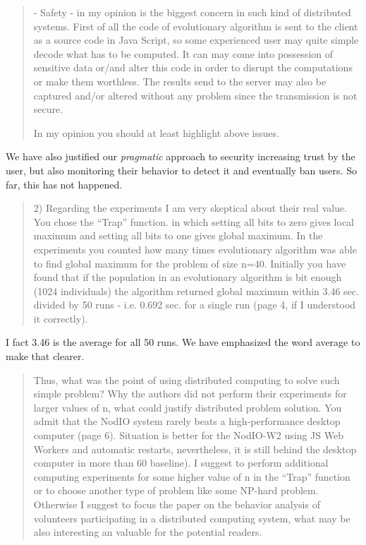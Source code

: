 \documentclass[preprint]{elsarticle}
\begin{document}
\begin{quote} 

 - Safety - in my opinion is the biggest concern in such kind of distributed systems. First of all the
 code of evolutionary algorithm is sent to the client as a source code in Java Script, so some
 experienced user may quite simple decode what has to be computed. It can may come into
 possession of sensitive data or/and alter this code in order to disrupt the computations or make
 them worthless. The results send to the server may also be captured and/or altered without any
 problem since the transmission is not secure.

 In my opinion you should at least highlight above issues.
\end{quote}

We have also justified our {\em pragmatic} approach to security
increasing trust by the user, but also monitoring their behavior to
detect it and eventually ban users. So far, this has not happened. 

\begin{quote}
2) Regarding the experiments I am very skeptical about their real value. You chose the ``Trap''
function. in which setting all bits to zero gives local maximum and setting all bits to one gives global
maximum. In the experiments you counted how many times evolutionary algorithm was able to find
global maximum for the problem of size n=40. Initially you have found that if the population in an
evolutionary algorithm is bit enough (1024 individuals) the algorithm returned global maximum
within 3.46 sec. divided by 50 runs - i.e. 0.692 sec. for a single run
(page 4, if I understood it correctly).
\end{quote}

I fact 3.46 is the average for all 50 runs. 
We have emphasized the word average to make that clearer.

\begin{quote}
Thus, what was the point of using distributed computing to solve such simple problem? Why the
authors did not perform their experiments for larger values of n, what could justify distributed problem
solution. You admit that the NodIO system rarely beats a high-performance desktop computer (page
6). Situation is better for the NodIO-W2 using JS Web Workers and automatic restarts, nevertheless,
it is still behind the desktop computer in more than 60%
baseline). I suggest to perform additional computing experiments for some higher value of n in the
``Trap'' function or to choose another type of problem like some NP-hard problem. Otherwise I suggest
to focus the paper on the behavior analysis of volunteers participating in a distributed computing
system, what may be also interesting an valuable for the potential
readers.
\end{quote}
\end{document}

